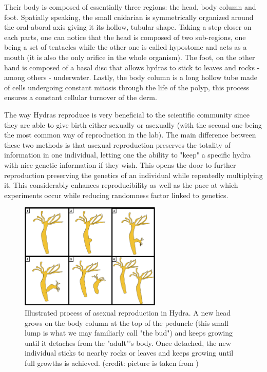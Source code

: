 Their body is composed of essentially three regions: the head, body column and foot. Spatially speaking, the small cnidarian is symmetrically organized around the oral-aboral axis giving it its hollow, tubular shape. Taking a step closer on each parts, one can notice that the head is composed of two sub-regions, one being a set of tentacles while the other one is called hypostome and acts as a mouth (it is also the only orifice in the whole organism). The foot, on the other hand is composed of a basal disc that allows hydras to stick to leaves and rocks - among others - underwater. Lastly, the body column is a long hollow tube made of cells undergoing constant mitosis through the life of the polyp, this process ensures a constant cellular turnover of the derm.

\begin{remark}
	The way Hydras reproduce is very beneficial to the scientific community since they are able to give birth either sexually or asexually (with the second one being the most common way of reproduction in the lab). The main difference between these two methods is that asexual reproduction preserves the totality of information in one individual, letting one the ability to "keep" a specific hydra with nice genetic information if they wish. This opens the door to further reproduction preserving the genetics of an individual while repeatedly multiplying it. This considerably enhances reproducibility as well as the pace at which experiments occur while reducing randomness factor linked to genetics.  
\end{remark}

\begin{figure}[h!]
	\centering
	\includegraphics[width=0.6\textwidth]{figures/hydra_asexual.png}
	\caption{Illustrated process of asexual reproduction in Hydra. A new head grows on the body column at the top of the peduncle (this small lump is what we may familiarly call "the bud") and keeps growing until it detaches from the "adult"'s body. Once detached, the new individual sticks to nearby rocks or leaves and keeps growing until full growths is achieved. (credit: picture is taken from \cite{Neupane2022})}
\end{figure}
  

